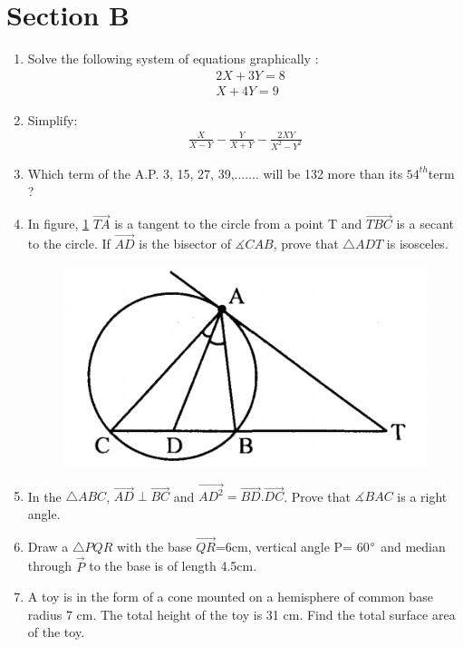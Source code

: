 \documentclass[journal,12pt,twocolumn]{IEEEtran}
\renewcommand\thesection{\arabic{section}}
\begin{document}
\section{Section B}
\renewcommand{\theequation}{\theenumi}
\begin{enumerate}[label=\thesection.\arabic*.,ref=\thesection.\theenumi]
\item Solve the following system of equations graphically :
\begin{align}
&2X+3Y=8\nonumber \\ &X+4Y=9 \nonumber
\end{align}
\item Simplify:
\begin{align}
\displaystyle\frac{X}{X-Y}-\displaystyle\frac{Y}{X+Y}-\displaystyle\frac{2XY}{X^2-Y^2} \nonumber
\end{align}
\item Which term of the A.P. 3, 15, 27, 39,....... will be 132 more than its $54^{th} $term ?
\item In figure, \ref{fig6} $\vec{TA}$ is a tangent to the circle from a point T and $\vec{TBC}$ is a secant to the circle. If $\vec{AD}$ is the bisector of $\measuredangle{CAB} $, prove that $\triangle{ADT} $ is isosceles.
\begin{figure}[h!]
	\centering
    \includegraphics[width=0.5\columnwidth,center]{6.png}
    \caption{}
    \label{fig6}
\end{figure}
 
 \item In  the $\triangle{ABC}$, $\vec{AD} \perp \vec{BC}$ and $\vec{AD^2}= \vec{BD}.\vec{DC}$.  Prove that $\measuredangle{BAC}$ is a right angle.
  
 \item Draw a $\triangle{PQR}$ with the base $\vec{QR}$=6cm, vertical angle P= 60$\degree$ and median through $\vec{P}$ to the base is of length 4.5cm.
 
 \item A toy is in the form of a cone mounted on a hemisphere of common base radius 7 cm. The total height of the toy is 31 cm. Find the total surface area of the toy.
 

\end{enumerate}
\end{document}
